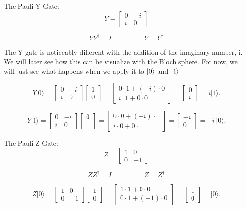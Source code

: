 \documentclass[12pt]{article}
\begin{document}
The Pauli-Y Gate:
$$
Y = \begin{bmatrix}
0 & -i \\
i & 0
\end{bmatrix}
$$

$$
YY^\dagger = I \hspace{2cm} Y = Y^\dagger
$$

The Y gate is noticeably different with the addition of the imaginary number, i. We will later see how this can be visualize with the Bloch sphere. For now, we will just see what happens when we apply it to $\ket{0}$ and $\ket{1}$

$$
Y \vert 0 \rangle = 
\begin{bmatrix} 0 & -i \\ i & 0 \end{bmatrix}
\begin{bmatrix} 1 \\ 0 \end{bmatrix}
=
\begin{bmatrix} 0\cdot 1 + (-i)\cdot 0 \\ i\cdot 1 + 0\cdot 0 \end{bmatrix}
=
\begin{bmatrix} 0 \\ i \end{bmatrix}
= i \vert 1 \rangle.
$$

$$
Y \vert 1 \rangle = 
\begin{bmatrix} 0 & -i \\ i & 0 \end{bmatrix}
\begin{bmatrix} 0 \\ 1 \end{bmatrix}
=
\begin{bmatrix} 0\cdot 0 + (-i)\cdot 1 \\ i\cdot 0 + 0\cdot 1 \end{bmatrix}
=
\begin{bmatrix} -i \\ 0 \end{bmatrix}
= -i\, \vert 0 \rangle.
$$

The Pauli-Z Gate:
$$
Z = \begin{bmatrix}
1 & 0 \\
0 & -1
\end{bmatrix}
$$

$$
ZZ^\dagger = I \hspace{2cm} Z = Z^\dagger
$$

$$
Z \vert 0 \rangle = 
\begin{bmatrix} 1 & 0 \\ 0 & -1 \end{bmatrix}
\begin{bmatrix} 1 \\ 0 \end{bmatrix}
=
\begin{bmatrix} 1\cdot 1 + 0\cdot 0 \\ 0\cdot 1 + (-1)\cdot 0 \end{bmatrix}
=
\begin{bmatrix} 1 \\ 0 \end{bmatrix}
= \vert 0 \rangle.
$$
\end{document}
